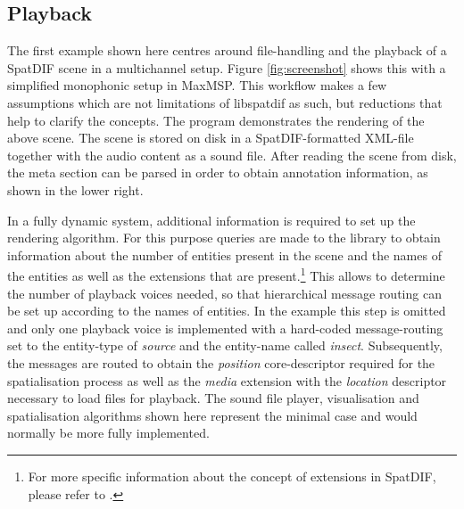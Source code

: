 \documentclass{article}
\begin{document}
\subsection{Playback}\label{subsec:playback}

The first example shown here centres around file-handling and the playback of a SpatDIF scene in a multichannel setup.
Figure \ref{fig:screenshot} shows this with a simplified monophonic setup in MaxMSP.
This workflow makes a few assumptions which are not limitations of libspatdif as such, but reductions that help to clarify the concepts.
The program demonstrates the rendering of the above scene.
The scene is stored on disk in a SpatDIF-formatted XML-file together with the audio content as a sound file.
After reading the scene from disk, the meta section can be parsed in order to obtain annotation information, as shown in the lower right.

In a fully dynamic system, additional information is required to set up the rendering algorithm.
For this purpose queries are made to the library to obtain information about the number of entities present in the scene and the names of the entities as well as the extensions that are present.\footnote{For more specific information about the concept of extensions in SpatDIF, please refer to \cite{SpatDIF_SMC12, Peters:2013SpatDifCMJ, SpatDIF_03}. }
This allows to determine the number of playback voices needed, so that hierarchical message routing can be set up according to the names of entities.
In the example this step is omitted and only one playback voice is implemented with a hard-coded message-routing set to the entity-type of \emph{source} and the entity-name called \emph{insect}.
Subsequently, the messages are routed to obtain the \emph{position} core-descriptor required for the spatialisation process as well as the \emph{media} extension with the \emph{location} descriptor necessary to load files for playback.
The sound file player, visualisation and spatialisation algorithms \cite{Schacher_ICMC_2006} shown here represent the minimal case and would normally be more fully implemented. %
\end{document}
